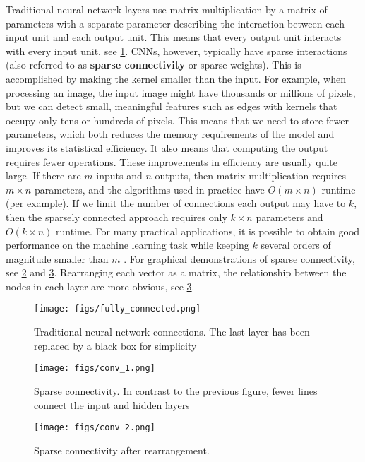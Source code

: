 Traditional neural network layers use matrix multiplication by a matrix of parameters with a separate parameter describing the interaction between each input unit and each output unit. This means that every output unit interacts with every input unit, see \cref{fig:fully_connected}.
CNNs, however, typically have sparse interactions (also referred to as \textbf{sparse connectivity} or sparse weights).
This is accomplished by making the kernel smaller than the input.
For example, when processing an image, the input image might have thousands or millions of pixels, but we can detect small, meaningful features such as edges with kernels that occupy only tens or hundreds of pixels. This means that we need to store
fewer parameters, which both reduces the memory requirements of the model and improves its statistical efficiency.
It also means that computing the output requires fewer operations. These improvements in efficiency are usually quite large.
If there are $m$ inputs and $n$ outputs, then matrix multiplication requires $m \times n$
parameters, and the algorithms used in practice have $O(m \times n)$ runtime (per example).
If we limit the number of connections each output may have to $k$, then the sparsely connected approach requires
only $k \times n$ parameters and $O(k \times n)$ runtime. For many practical applications, it is possible to obtain good performance
on the machine learning task while keeping $k$ several orders of magnitude smaller
than $m$ \cite{Ian16}. For graphical demonstrations of sparse connectivity, see \cref{fig:s_conv_1} and \cref{fig:s_conv_2}. Rearranging each vector as a matrix, the relationship between the nodes in each layer are more obvious, see \cref{fig:s_conv_2}.

\begin{figure}[!htbp]
  \centering
  \texttt{[image: figs/fully\_connected.png]}
  \caption[Traditional neural network connections]{Traditional neural network connections. The last layer has been replaced by a black box for simplicity}\label{fig:fully_connected}
\end{figure}

\begin{figure}[!htbp]
  \centering
  \texttt{[image: figs/conv\_1.png]}
  \caption{Sparse connectivity. In contrast to the previous figure, fewer lines connect the input and hidden layers}\label{fig:s_conv_1}
\end{figure}

\begin{figure}[!htbp]
  \centering
  \texttt{[image: figs/conv\_2.png]}
  \caption{Sparse connectivity after rearrangement.}\label{fig:s_conv_2}
\end{figure}

